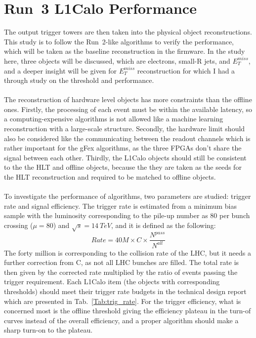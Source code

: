 \section{Run~3 L1Calo Performance}
The output trigger towers are then taken into the physical object reconstructions. This study is to follow the Run~2-like algorithms to verify the performance, which will be taken as the baseline reconstruction in the firmware. In the study here, three objects will be discussed, which are electrons, small-R jets, and $E^{miss}_{T}$, and a deeper insight will be given for $E^{miss}_{T}$ reconstruction for which I had a through study on the threshold and performance. 
\\
\\The reconstruction of hardware level objects has more constraints than the offline ones. Firstly, the processing of each event must be within the available latency, so a computing-expensive algorithms is not allowed like a machine learning reconstruction with a large-scale structure. Secondly, the hardware limit should also be considered like the communicating between the readout channels which is rather important for the gFex algorithms, as the three FPGAs don't share the signal between each other. Thirdly, the L1Calo objects should still be consistent to the the HLT and offline objects, because the they are taken as the seeds for the HLT reconstruction and required to be matched to offline objects. 
\\
\\To investigate the performance of algorithms, two parameters are studied: trigger rate and signal efficiency. The trigger rate is estimated from a minimum bias sample with the luminosity corresponding to the pile-up number as 80 per bunch crossing ($\mu=80$) and $\sqrt{s}=14~TeV$, and it is defined as the following:
\begin{equation}
Rate = 40M\times C\times\frac{N^{pass}}{N^{all}}
\end{equation} 
The forty million is corresponding to the collision rate of the LHC, but it needs a further correction from C, as not all LHC bunches are filled. The total rate is then given by the corrected rate multiplied by the ratio of events passing the trigger requirement. Each L1Calo item (the objects with corresponding thresholds) should meet their trigger rate budgets in the technical design report which are presented in Tab.~\ref{Tab:trig_rate}. For the trigger efficiency, what is concerned most is the offline threshold giving the efficiency plateau in the turn-of curves instead of the overall efficiency, and a proper algorithm should make a sharp turn-on to the plateau.  
